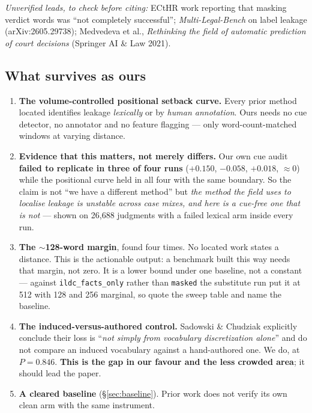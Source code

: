 \documentclass[12pt,a4paper]{article}
\newcommand{\code}[1]{\texttt{\small #1}}
\begin{document}
\emph{Unverified leads, to check before citing:} ECtHR work reporting that masking verdict words was
``not completely successful''; \emph{Multi-Legal-Bench} on label leakage (arXiv:2605.29738);
Medvedeva et al., \emph{Rethinking the field of automatic prediction of court decisions} (Springer AI
\& Law 2021).

\subsection{What survives as ours}

\begin{enumerate}
\item \textbf{The volume-controlled positional setback curve.} Every prior method located identifies
leakage \emph{lexically} or by \emph{human annotation}. Ours needs no cue detector, no annotator and
no feature flagging --- only word-count-matched windows at varying distance.
\item \textbf{Evidence that this matters, not merely differs.} Our own cue audit \textbf{failed to
replicate in three of four runs} ($+0.150$, $-0.058$, $+0.018$, $\approx 0$) while the positional
curve held in all four with the same boundary. So the claim is not ``we have a different method'' but
\emph{the method the field uses to localise leakage is unstable across case mixes, and here is a
cue-free one that is not} --- shown on 26,688 judgments with a failed lexical arm inside every run.
\item \textbf{The $\sim$128-word margin}, found four times. No located work states a distance. This is
the actionable output: a benchmark built this way needs that margin, not zero. It is a lower bound
under one baseline, not a constant --- against \code{ildc\_facts\_only} rather than \code{masked} the
substitute run put it at 512 with 128 and 256 marginal, so quote the sweep table and name the
baseline.
\item \textbf{The induced-versus-authored control.} Sadowski \& Chudziak explicitly conclude their
loss is ``\emph{not simply from vocabulary discretization alone}'' and do not compare an induced
vocabulary against a hand-authored one. We do, at $P=0.846$. \textbf{This is the gap in our favour
and the less crowded area}; it should lead the paper.
\item \textbf{A cleared baseline} (§\ref{sec:baseline}). Prior work does not verify its own clean arm
with the same instrument.
\end{enumerate}
\end{document}

